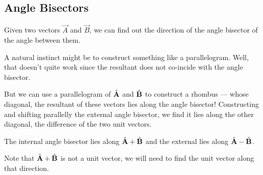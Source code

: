 \subsection{Angle Bisectors}

Given two vectors \(\vec{A}\) and \(\vec{B}\), we can find out 
the direction of the angle bisector of the angle between them.

A natural instinct might be to construct something like a parallelogram. Well, 
that doesn't quite work since the resultant does not co-incide with the angle bisector. 

But we can use a parallelogram of \(\hat{\boldsymbol{\mathbf{A}}}\) and \(\hat{\boldsymbol{\mathbf{B}}}\) to construct a rhombus ---
whose diagonal, the resultant of these vectors lies along the angle bisector! Constructing 
and shifting parallelly the external angle bisector, we find it lies along the other diagonal,
the difference of the two unit vectors.

\begin{marginfigure}
    \centering
    \caption{The internal angle bisector lies along \(\hat{\boldsymbol{\mathbf{A}}} + \hat{\boldsymbol{\mathbf{B}}}\) and
    the external lies along \(\hat{\boldsymbol{\mathbf{A}}} - \hat{\boldsymbol{\mathbf{B}}}\).}
\end{marginfigure}

Note that \(\hat{\boldsymbol{\mathbf{A}}} + \hat{\boldsymbol{\mathbf{B}}}\) is not a unit vector, we will need to find the 
unit vector along that direction. 